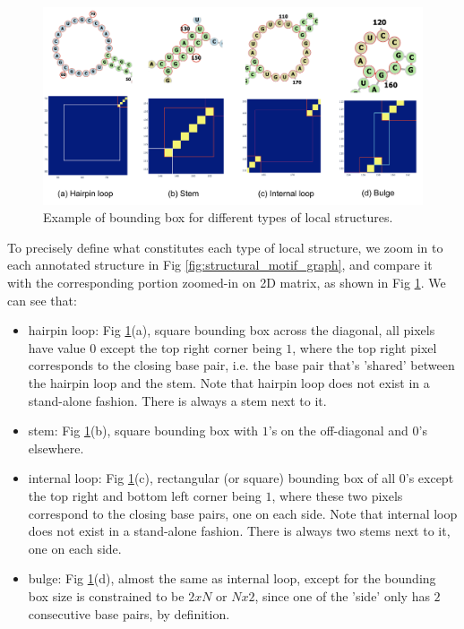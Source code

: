 \documentclass[12pt]{article}
\begin{document}
\begin{figure}[h]
    \centering
    \includegraphics[width=\textwidth]{plot/local_bounding_box_examples.png}
    \caption{Example of bounding box for different types of local structures.}
    \label{fig:local_bounding_box_examples}
    \centering
\end{figure}


To precisely define what constitutes each type of local structure,
we zoom in to each annotated structure in Fig \ref{fig:structural_motif_graph},
and compare it with the corresponding portion zoomed-in on 2D matrix, as shown in
Fig \ref{fig:local_bounding_box_examples}.
We can see that:

\begin{itemize}
    \item hairpin loop: Fig \ref{fig:local_bounding_box_examples}(a),
    square bounding box across the diagonal, all pixels have value $0$ except the top right corner being $1$,
    where the top right pixel corresponds to the
    closing base pair, i.e. the base pair that's 'shared' between the hairpin loop and the stem.
    Note that hairpin loop does not exist in a stand-alone fashion.
    There is always a stem next to it.

    \item stem: Fig \ref{fig:local_bounding_box_examples}(b),
    square bounding box with $1$'s on the off-diagonal and $0$'s elsewhere.


    \item internal loop: Fig \ref{fig:local_bounding_box_examples}(c),
    rectangular (or square) bounding box of all $0$'s except the top right and bottom left corner being $1$,
    where these two pixels correspond to the closing base pairs, one on each side.
    Note that internal loop does not exist in a stand-alone fashion.
    There is always two stems next to it, one on each side.

    \item bulge: Fig \ref{fig:local_bounding_box_examples}(d),
    almost the same as internal loop, except for the bounding box size is constrained
    to be $2xN$ or $Nx2$, since one of the 'side' only has $2$ consecutive base pairs, by definition.
\end{itemize}
\end{document}
